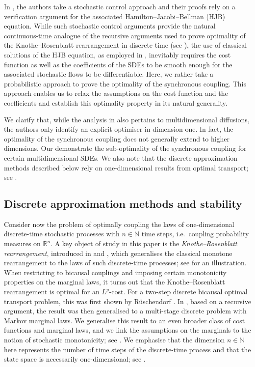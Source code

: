 \documentclass[oneside]{amsart}
\theoremstyle{definition}
\newcommand{\N}{\mathbb N}
\newcommand{\R}{\mathbb R}
\def\R{{\mathbb R}}
\numberwithin{equation}{section}
\begin{document}
 	In \cite{BiTa19}, the authors take a stochastic control approach and their proofs rely on a verification argument for the associated Hamilton--Jacobi--Bellman (HJB) equation. 
 	While such stochastic control arguments provide the natural continuous-time analogue of the recursive arguments used to prove optimality of the Knothe--Rosenblatt rearrangement in discrete time (see ), the use of classical solutions of the HJB equation, as employed in \cite{BiTa19}, inevitably requires the cost function as well as the coefficients of the SDEs to be smooth enough for the associated stochastic flows to be differentiable. 
	Here, we rather take a probabilistic approach to prove the optimality of the synchronous coupling. This approach enables us to relax the assumptions on the cost function and the coefficients and establish this optimality property in its natural generality.
	
	We clarify that, while the analysis in \cite{BiTa19} also pertains to multidimensional diffusions, the authors only identify an explicit optimiser in dimension one. In fact, the optimality of the synchronous coupling does not generally extend to higher dimensions. Our  demonstrate the sub-optimality of the synchronous coupling for certain multidimensional SDEs. We also note that the discrete approximation methods described below rely on one-dimensional results from optimal transport; see .



\subsection*{Discrete approximation methods and stability}
	
	Consider now the problem of optimally coupling the laws of one-dimensional discrete-time stochastic processes with $n \in \N$ time steps, i.e.~coupling probability measures on $\R^n$.
	A key object of study in this paper is the \emph{Knothe--Rosenblatt rearrangement}, introduced in \cite{Ro52} and \cite{Kn57}, which generalises the classical monotone rearrangement to the laws of such discrete-time processes; see  for an illustration.
	When restricting to bicausal couplings and imposing certain monotonicity properties on the marginal laws, it turns out that the Knothe--Rosenblatt rearrangement is optimal for an $L^p$-cost.
	For a two-step discrete bicausal optimal transport problem, this was first shown by R{\"u}schendorf \cite{Ru85}. In \cite{BaBeLiZa17}, based on a recursive argument, the result was then generalised to a multi-stage discrete problem with Markov marginal laws. We generalise this result to an even broader class of cost functions and marginal laws, and we link the assumptions on the marginals to the notion of stochastic monotonicity; see . We emphasise that the dimension $n \in \N$ here represents the number of time steps of the discrete-time process and that the state space is necessarily one-dimensional; see .
	
\end{document}
